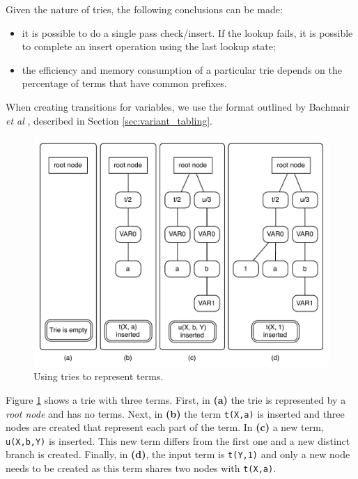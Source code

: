 Given the nature of tries, the following conclusions can be made:

\begin{itemize}
  \item it is possible to do a single pass check/insert. If the lookup
  fails, it is possible to complete an insert operation using the last lookup state;
  \item the efficiency and memory consumption of a
  particular trie depends on the percentage of terms that have common prefixes.
\end{itemize}

When creating transitions for variables, we use the format outlined by Bachmair \textit{et al} \cite{Bachmair-93},
described in Section \ref{sec:variant_tabling}.

\begin{figure}[ht]
  \centering
    \includegraphics[scale=0.6]{tries.pdf}
  \caption{Using tries to represent terms.}
  \label{fig:tries_use}
\end{figure}

Figure \ref{fig:tries_use} shows a trie with three terms. First, in \textbf{(a)} the trie is represented by a \textit{root node} and has
no terms. Next, in \textbf{(b)} the term \texttt{t(X,a)} is inserted and three nodes are created that represent each part of the term.
In \textbf{(c)} a new term, \texttt{u(X,b,Y)} is inserted. This new term differs from the first one and a new distinct branch is created.
Finally, in \textbf{(d)}, the input term is \texttt{t(Y,1)} and only a new node needs to be created as this term shares two nodes
with \texttt{t(X,a)}.

